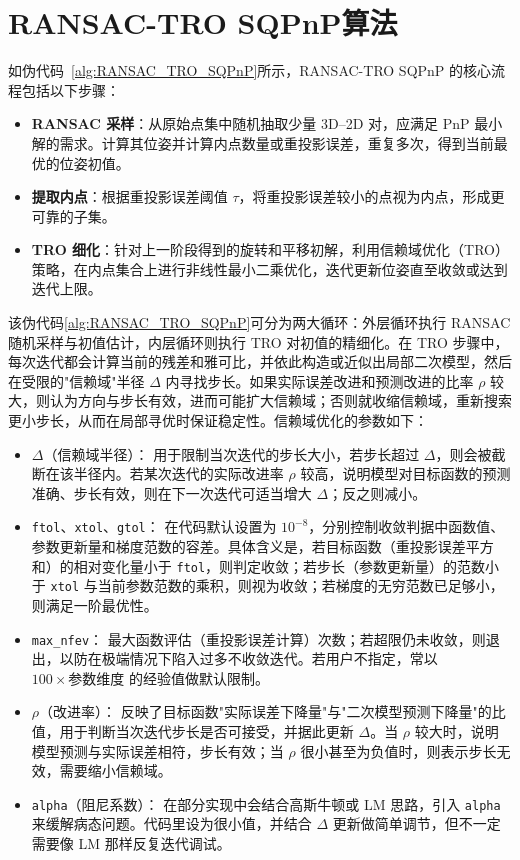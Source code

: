 \section{RANSAC-TRO SQPnP算法}
\label{sec:RANSAC-TRO-SQPnP:Algorithm}

如伪代码~\ref{alg:RANSAC_TRO_SQPnP}所示，RANSAC-TRO SQPnP 的核心流程包括以下步骤：
\begin{itemize}
	\item \textbf{RANSAC 采样}：从原始点集中随机抽取少量 3D--2D 对，应满足 PnP 最小解的需求。计算其位姿并计算内点数量或重投影误差，重复多次，得到当前最优的位姿初值。
	\item \textbf{提取内点}：根据重投影误差阈值 $\tau$，将重投影误差较小的点视为内点，形成更可靠的子集。
	\item \textbf{TRO 细化}：针对上一阶段得到的旋转和平移初解，利用信赖域优化（TRO）策略，在内点集合上进行非线性最小二乘优化，迭代更新位姿直至收敛或达到迭代上限。
\end{itemize}

该伪代码\autoref{alg:RANSAC_TRO_SQPnP}可分为两大循环：外层循环执行 RANSAC 随机采样与初值估计，内层循环则执行 TRO 对初值的精细化。在 TRO 步骤中，每次迭代都会计算当前的残差和雅可比，并依此构造或近似出局部二次模型，然后在受限的"信赖域"半径 $\Delta$ 内寻找步长。如果实际误差改进和预测改进的比率 $\rho$ 较大，则认为方向与步长有效，进而可能扩大信赖域；否则就收缩信赖域，重新搜索更小步长，从而在局部寻优时保证稳定性。信赖域优化的参数如下：
\begin{itemize}
	\item \textbf{$\Delta$}（信赖域半径）：
	用于限制当次迭代的步长大小，若步长超过 $\Delta$，则会被截断在该半径内。若某次迭代的实际改进率 $\rho$ 较高，说明模型对目标函数的预测准确、步长有效，则在下一次迭代可适当增大 $\Delta$；反之则减小。
	
	\item {\texttt{ftol}、\texttt{xtol}、\texttt{gtol}}：
	在代码默认设置为 $10^{-8}$，分别控制收敛判据中函数值、参数更新量和梯度范数的容差。具体含义是，若目标函数（重投影误差平方和）的相对变化量小于 \texttt{ftol}，则判定收敛；若步长（参数更新量）的范数小于 \texttt{xtol} 与当前参数范数的乘积，则视为收敛；若梯度的无穷范数已足够小，则满足一阶最优性。
	
	\item \texttt{max\_nfev}：
	最大函数评估（重投影误差计算）次数；若超限仍未收敛，则退出，以防在极端情况下陷入过多不收敛迭代。若用户不指定，常以 $100\times\text{参数维度}$ 的经验值做默认限制。
	
	\item $\rho$（改进率）：
	反映了目标函数"实际误差下降量"与"二次模型预测下降量"的比值，用于判断当次迭代步长是否可接受，并据此更新 $\Delta$。当 $\rho$ 较大时，说明模型预测与实际误差相符，步长有效；当 $\rho$ 很小甚至为负值时，则表示步长无效，需要缩小信赖域。
	
	\item \texttt{alpha}（阻尼系数）：
	在部分实现中会结合高斯牛顿或 LM 思路，引入 \texttt{alpha} 来缓解病态问题。代码里设为很小值，并结合 $\Delta$ 更新做简单调节，但不一定需要像 LM 那样反复迭代调试。
\end{itemize}

